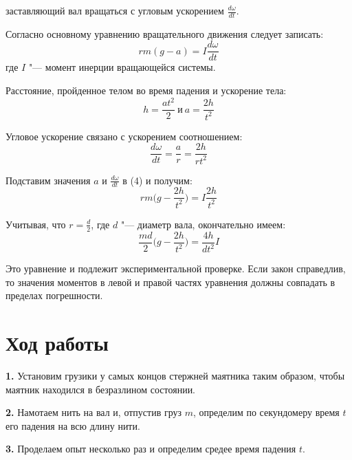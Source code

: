 \documentclass{article}
\begin{document}
заставляющий вал вращаться с угловым ускорением
$\frac{d\omega}{dt}$.

Согласно основному уравнению вращательного движения следует
записать:
\begin{equation}
    rm(g-a) = I\frac{d\omega}{dt}  \nonumber
\end{equation}
где $I$ "--- момент инерции вращающейся системы.

Расстояние, пройденное телом во время падения и
ускорение тела:
\begin{equation}
    h = \frac{at^2}{2}~\text{и}~a = \frac{2h}{t^2} \nonumber
\end{equation}

Угловое ускорение связано с ускорением соотношением: 
\begin{equation}
    \frac{d\omega}{dt} = \frac{a}{r} = \frac{2h}{rt^2} \nonumber
\end{equation}

Подставим значения $a$ и $\frac{d\omega}{dt}$ в (4) и получим:
\begin{equation}
    rm\Big(g-\frac{2h}{t^2}\Big) = I\frac{2h}{t^2} \nonumber
\end{equation}

Учитывая, что $r=\frac{d}{2}$, где $d$ "--- диаметр вала,
окончательно имеем:
\begin{equation}
    \frac{md}{2}\Big(g-\frac{2h}{t^2}\Big) = \frac{4h}{dt^2}I \nonumber
\end{equation}

Это уравнение и подлежит экспериментальной проверке. Если
закон справедлив, то значения моментов  в левой и правой
частях уравнения должны совпадать в пределах погрешности.

\section{Ход работы}
\textbf{1.} Установим грузики у самых концов стержней маятника таким
образом, чтобы маятник находился в безразлином состоянии.

\vspace{0.5cm}

\textbf{2.} Намотаем нить на вал и, отпустив груз $m$, определим по
секундомеру время $t$ его падения на всю длину нити.

\vspace{0.5cm}

\textbf{3.} Проделаем опыт несколько раз и определим средее время
падения $t$.

\vspace{0.5cm}
\end{document}
